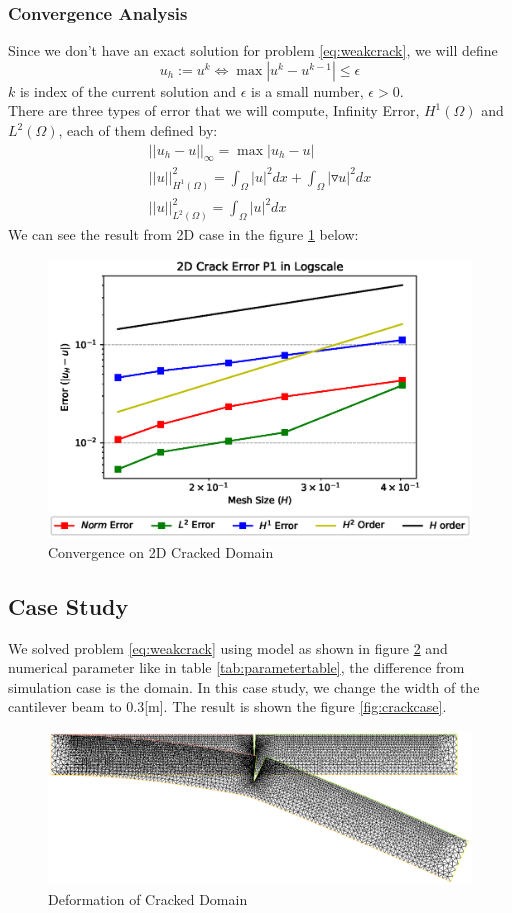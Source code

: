 \documentclass[a4paper,11pt]{article}
\begin{document}
\subsubsection{Convergence Analysis}
Since we don't have an exact solution for problem \eqref{eq:weakcrack}, we will define $$u_h:= u^k \iff \max|u^k-u^{k-1}| \leq \epsilon$$ $k$ is index of the current solution and $\epsilon$ is a small number, $\epsilon > 0$.\\
There are three types of error that we will compute, Infinity Error, $H^1(\Omega)$ and $L^2(\Omega)$, each of them defined by:
\begin{eqnarray}
||u_h - u||_\infty = \max|u_h-u|\\
||u||^2_{H^1(\Omega)} = \int_\Omega |u|^2 dx + \int_\Omega |\triangledown u|^2 dx\\
||u||^2_{L^2(\Omega)} = \int_\Omega |u|^2 dx
\end{eqnarray}
We can see the result from 2D case in the figure \ref{fig:all2dcrackerror} below:
\begin{figure}[h!]
	\centering
	\includegraphics[width=0.7\linewidth]{picture/conference/crackerrp1}
	\caption{Convergence on 2D Cracked Domain}
	\label{fig:all2dcrackerror}
\end{figure}
\newline
\newpage
\subsection{Case Study}
We solved problem \eqref{eq:weakcrack} using model as shown in figure \ref{fig:mesh-deform-case} and numerical parameter like in table \ref{tab:parametertable}, the difference from simulation case is the domain. In this case study, we change the width of the cantilever beam to 0.3[m]. The result is shown the figure \ref{fig:crackcase}.

\begin{figure}[h!]
	\centering
	\includegraphics[width=\linewidth]{picture/conference/mesh-deform-case}
	\caption{Deformation of Cracked Domain}
	\label{fig:mesh-deform-case}
\end{figure}
\end{document}
